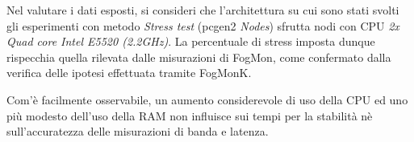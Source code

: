         Nel valutare i dati esposti, si consideri che l'architettura su cui sono stati svolti gli esperimenti con metodo \textit{Stress test} (pcgen2 \textit{Nodes}\cite{pcgen2}) sfrutta nodi con CPU \textit{2x Quad core Intel E5520 (2.2GHz)}. La percentuale di stress imposta dunque rispecchia quella rilevata dalle misurazioni di FogMon, come confermato dalla verifica delle ipotesi effettuata tramite FogMonK.
        
        Com'è facilmente osservabile, un aumento considerevole di uso della CPU ed uno più modesto dell'uso della RAM non influisce sui tempi per la stabilità nè sull'accuratezza delle misurazioni di banda e latenza.